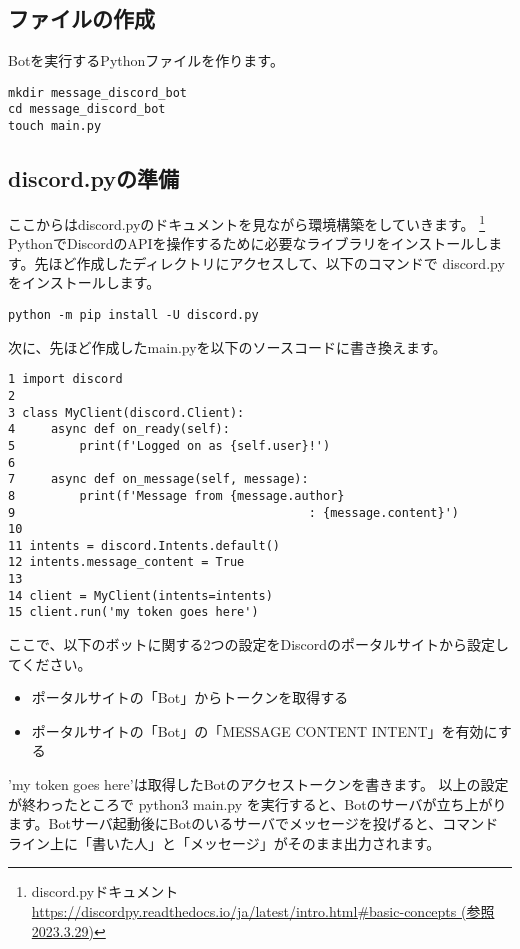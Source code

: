 \subsection{ファイルの作成}
Botを実行するPythonファイルを作ります。
\begin{shaded}
\begin{verbatim}
mkdir message_discord_bot
cd message_discord_bot
touch main.py
\end{verbatim}
\end{shaded}

\subsection{discord.pyの準備}
ここからはdiscord.pyのドキュメントを見ながら環境構築をしていきます。
\footnote{discord.pyドキュメント\url{https://discordpy.readthedocs.io/ja/latest/intro.html#basic-concepts (参照2023.3.29)}}
PythonでDiscordのAPIを操作するために必要なライブラリをインストールします。先ほど作成したディレクトリにアクセスして、以下のコマンドで discord.py をインストールします。
\begin{shaded}
\begin{verbatim}
python -m pip install -U discord.py
\end{verbatim}
\end{shaded}
次に、先ほど作成したmain.pyを以下のソースコードに書き換えます。
\begin{tcolorbox}[breakable]
\begin{verbatim}
1 import discord
2 
3 class MyClient(discord.Client):
4     async def on_ready(self):
5         print(f'Logged on as {self.user}!')
6 
7     async def on_message(self, message):
8         print(f'Message from {message.author}
9                                         : {message.content}')
10
11 intents = discord.Intents.default()
12 intents.message_content = True
13
14 client = MyClient(intents=intents)
15 client.run('my token goes here')
\end{verbatim}
\end{tcolorbox}
ここで、以下のボットに関する2つの設定をDiscordのポータルサイトから設定してください。
\begin{itemize}
  \item ポータルサイトの「Bot」からトークンを取得する
  \item ポータルサイトの「Bot」の「MESSAGE CONTENT INTENT」を有効にする
\end{itemize}
'my token goes here'は取得したBotのアクセストークンを書きます。
以上の設定が終わったところで python3 main.py を実行すると、Botのサーバが立ち上がります。Botサーバ起動後にBotのいるサーバでメッセージを投げると、コマンドライン上に「書いた人」と「メッセージ」がそのまま出力されます。

